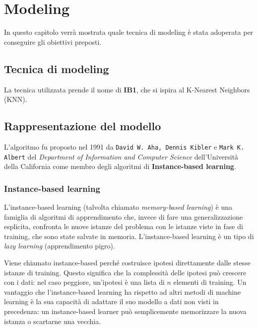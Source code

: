 	\chapter{Modeling}
In questo capitolo verrà mostrata quale tecnica di modeling è stata adoperata per conseguire gli obiettivi preposti.

\section{Tecnica di modeling}
La tecnica utilizzata prende il nome di \textbf{IB1}, che si ispira al K-Nearest Neighbors (KNN).

\section{Rappresentazione del modello}

L'algoritmo fu proposto nel 1991 da \texttt{David W. Aha, Dennis Kibler} e \texttt{Mark K. Albert} del \emph{Department of Information and Computer Science} dell'Università della California come membro degli algoritmi di \textbf{Instance-based learning}.

\subsection{Instance-based learning}
L'instance-based learning (talvolta chiamato \emph{memory-based learning}) è una famiglia di algoritmi di apprendimento che, invece di fare una generalizzazione esplicita, confronta le nuove istanze del problema con le istanze viste in fase di training, che sono state salvate in memoria. L'instance-based learning è un tipo di \emph{lazy learning} (apprendimento pigro).


Viene chiamato instance-based perché costruisce ipotesi direttamente dalle stesse istanze di training. Questo significa che la complessità delle ipotesi può crescere con i dati: nel caso peggiore, un'ipotesi è una lista di $ n $ elementi di training. Un vantaggio che l'instance-based learning ha rispetto ad altri metodi di machine learning è la sua capacità di adattare il suo modello a dati non visti in precedenza: un instance-based learner può semplicemente memorizzare la nuova istanza o scartarne una vecchia.

